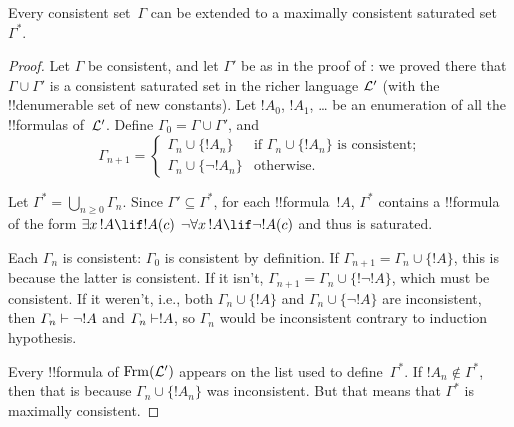 \documentclass[../../include/open-logic-section]{subfiles}
\begin{document}

\begin{lem}
Every consistent set~$\Gamma$ can be extended to a maximally
consistent saturated set~$\Gamma^*$.
\end{lem}

\begin{proof}
Let $\Gamma$ be consistent, and let $\Gamma'$ be as in the proof of
: we proved there that $\Gamma \cup \Gamma'$
is a consistent saturated set in the richer language $\mathcal L'$ (with
the !!{denumerable} set of new constants). Let $!A_0$, $!A_1$, \dots{}
be an enumeration of all the !!{formula}s of~$\mathcal L'$. Define
$\Gamma_0 = \Gamma \cup \Gamma'$, and
\[
\Gamma_{n+1} =
\begin{cases}
\Gamma_n \cup \{ !A_n \} & \textrm{if $\Gamma_n \cup \{!A_n\}$ is
  consistent;} \\ 
\Gamma_n \cup \{ \lnot !A_n \} & \textrm{otherwise.}
\end{cases}
\]

Let $\Gamma^* = \bigcup_{n \geq 0} \Gamma_n$. Since $\Gamma' \subseteq
\Gamma^*$, for each !!{formula}~$!A$, $\Gamma^*$ contains a
!!{formula} of the form
{$\lexists[x][!A] \lif !A(c)$}
{$\lnot\lforall[x][!A] \lif \lnot !A(c)$}
and thus is saturated.

Each $\Gamma_n$ is consistent: $\Gamma_0$ is consistent by
definition. If $\Gamma_{n+1} = \Gamma_n \cup \{!A\}$, this is because
the latter is consistent.  If it isn't, $\Gamma_{n+1} = \Gamma_n \cup
\{!\lnot !A\}$, which must be consistent.  If it weren't, i.e., both
$\Gamma_n \cup \{!A\}$ and $\Gamma_n \cup \{\lnot !A\}$ are
inconsistent, then $\Gamma_n \Proves \lnot !A$ and $\Gamma_n \Proves
!A$, so $\Gamma_n$ would be inconsistent contrary to induction
hypothesis.

Every !!{formula} of $\Frm[L']$ appears on the list used to
define~$\Gamma^*$.  If $!A_n \notin \Gamma^*$, then that is because
$\Gamma_n \cup \{!A_n\}$ was inconsistent.  But that means that
$\Gamma^*$ is maximally consistent.
\end{proof}
\end{document}
